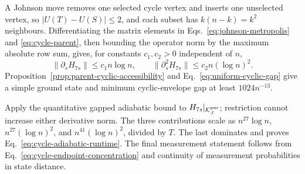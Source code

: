 A Johnson move removes one selected cycle vertex and inserts one unselected
vertex, so $|U(T)-U(S)|\leq2$, and each subset has
$k(n-k)=k^2$ neighbours.  Differentiating the matrix elements in
Eqs.~\eqref{eq:johnson-metropolis} and \eqref{eq:cycle-parent}, then bounding
the operator norm by the maximum absolute row sum, gives, for constants
$c_1,c_2>0$ independent of $n$,
\begin{equation}
 \|\partial_sH_{7s}\|\leq c_1n\log n,
 \qquad
 \|\partial_s^2H_{7s}\|\leq c_2n(\log n)^2.
 \label{eq:cycle-parent-derivative-bounds}
\end{equation}
Proposition~\ref{prop:parent-cyclic-accessibility} and
Eq.~\eqref{eq:uniform-cyclic-gap} give a simple ground state and minimum
cyclic-envelope gap at least $1024n^{-13}$.

Apply the quantitative gapped adiabatic bound
\cite{JansenRuskaiSeiler2007} to
$H_{7s}|_{\mathcal K_J^{\rm par}}$; restriction cannot increase either
derivative norm.  The three contributions scale as
$n^{27}\log n$, $n^{27}(\log n)^2$, and
$n^{41}(\log n)^2$, divided by $T$.  The last dominates and proves
Eq.~\eqref{eq:cycle-adiabatic-runtime}.  The final measurement statement
follows from Eq.~\eqref{eq:cycle-endpoint-concentration} and continuity of
measurement probabilities in state distance.

